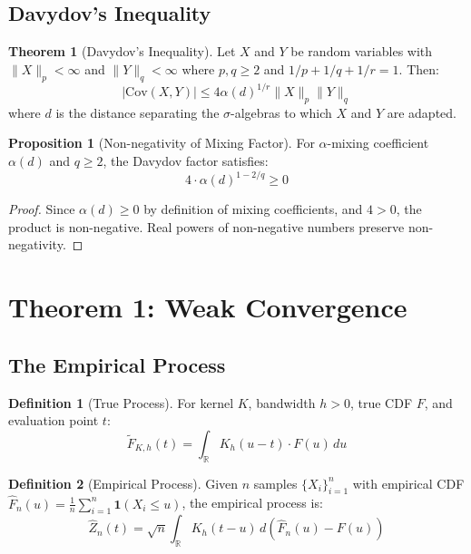 \documentclass[11pt,a4paper]{article}
\theoremstyle{definition}
\newtheorem{definition}{Definition}[section]
\newtheorem{theorem}{Theorem}[section]
\newtheorem{proposition}{Proposition}[section]
\begin{document}
\subsection{Davydov's Inequality}

\begin{theorem}[Davydov's Inequality]
Let $X$ and $Y$ be random variables with $\|X\|_p < \infty$ and $\|Y\|_q < \infty$ where $p, q \geq 2$ and $1/p + 1/q + 1/r = 1$. Then:
\begin{equation}
|\text{Cov}(X, Y)| \leq 4 \alpha(d)^{1/r} \|X\|_p \|Y\|_q
\end{equation}
where $d$ is the distance separating the $\sigma$-algebras to which $X$ and $Y$ are adapted.
\end{theorem}

\begin{proposition}[Non-negativity of Mixing Factor]
For $\alpha$-mixing coefficient $\alpha(d)$ and $q \geq 2$, the Davydov factor satisfies:
\begin{equation}
4 \cdot \alpha(d)^{1 - 2/q} \geq 0
\end{equation}
\end{proposition}

\begin{proof}
Since $\alpha(d) \geq 0$ by definition of mixing coefficients, and $4 > 0$, the product is non-negative. Real powers of non-negative numbers preserve non-negativity.
\end{proof}

\section{Theorem 1: Weak Convergence}

\subsection{The Empirical Process}

\begin{definition}[True Process]
For kernel $K$, bandwidth $h > 0$, true CDF $F$, and evaluation point $t$:
\begin{equation}
\tilde{F}_{K,h}(t) = \int_{\mathbb{R}} K_h(u - t) \cdot F(u) \, du
\end{equation}
\end{definition}

\begin{definition}[Empirical Process]
Given $n$ samples $\{X_i\}_{i=1}^n$ with empirical CDF $\hat{F}_n(u) = \frac{1}{n}\sum_{i=1}^n \mathbf{1}(X_i \leq u)$, the empirical process is:
\begin{equation}
\hat{Z}_n(t) = \sqrt{n} \int_{\mathbb{R}} K_h(t - u) \, d(\hat{F}_n(u) - F(u))
\end{equation}
\end{definition}
\end{document}
